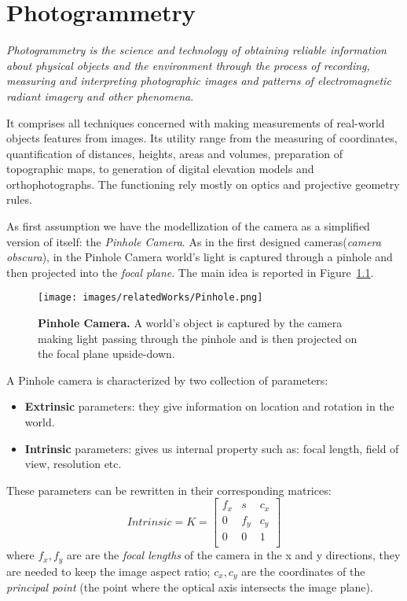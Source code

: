 \chapter{Photogrammetry}
\textit{Photogrammetry is the science and technology of 
obtaining reliable information about physical objects and
the environment through the process of recording,
measuring and interpreting photographic images and patterns 
of electromagnetic radiant imagery and other 
phenomena}\cite{examplewebsite}.

It comprises all techniques concerned with making measurements of
real-world objects features from images.
Its utility range from the measuring of coordinates, quantification
of distances, heights, areas and volumes, preparation
of topographic maps, to generation of digital elevation 
models and orthophotographs. The functioning rely mostly on optics and projective geometry rules. 

\vspace{12pt}

As first assumption we have the modellization of the camera as a simplified
version of itself: the \textit{Pinhole Camera}. As in the first designed
cameras(\textit{camera obscura}), in the Pinhole Camera world's light is 
captured through a pinhole and then projected into the \textit{focal plane}.
The main idea is reported in Figure~\ref{fig:pinhole}.

\begin{figure}
    \centering
    \texttt{[image: images/relatedWorks/Pinhole.png]} %
    \caption{\textbf{Pinhole Camera.} A world's object is captured by the camera making light passing through 
    the pinhole and is then projected on the focal plane upside-down.}
    \label{fig:pinhole}
  \end{figure}
  
A Pinhole camera is characterized by two collection of parameters:
\begin{itemize}
    \item  \textbf{Extrinsic} parameters: they give information on location
                                        and rotation in the world.
    \item  \textbf{Intrinsic} parameters: gives us internal property such as:
                                    focal length, field of view, resolution etc.
\end{itemize}  
These parameters can be rewritten in their corresponding matrices:
\[
  Intrinsic=K= \begin{bmatrix}
    f_{x} & s & c_{x} \\
    0 & f_{y} & c_{y} \\
    0 & 0     & 1     \\
  \end{bmatrix}
\]
where $f_{x},f_{y}$ are are the \textit{focal lengths} of the camera in the x and y directions, 
  they are needed to keep the image aspect ratio;
  $c_{x},c_{y}$ are the coordinates of the \textit{principal point}
  (the point where the optical axis intersects the image plane).

